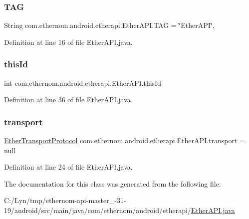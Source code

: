 \subsubsection{\texorpdfstring{T\+AG}{TAG}}
{\footnotesize\ttfamily String com.\+ethernom.\+android.\+etherapi.\+Ether\+A\+P\+I.\+T\+AG = \char`\"{}Ether\+A\+PI\char`\"{}\hspace{0.3cm}{\ttfamily [static]}, {\ttfamily [package]}}



Definition at line 16 of file Ether\+A\+P\+I.\+java.

\mbox{\label{classcom_1_1ethernom_1_1android_1_1etherapi_1_1_ether_a_p_i_a4eb73235f8638afdb798f4351a885951}} 
\subsubsection{\texorpdfstring{this\+Id}{thisId}}
{\footnotesize\ttfamily int com.\+ethernom.\+android.\+etherapi.\+Ether\+A\+P\+I.\+this\+Id}



Definition at line 36 of file Ether\+A\+P\+I.\+java.

\mbox{\label{classcom_1_1ethernom_1_1android_1_1etherapi_1_1_ether_a_p_i_a5af3360721f7c9fadd6221855fa3f4f8}} 
\subsubsection{\texorpdfstring{transport}{transport}}
{\footnotesize\ttfamily \mbox{\hyperlink{classcom_1_1ethernom_1_1android_1_1etherapi_1_1_ether_transport_protocol}{Ether\+Transport\+Protocol}} com.\+ethernom.\+android.\+etherapi.\+Ether\+A\+P\+I.\+transport = null\hspace{0.3cm}{\ttfamily [package]}}



Definition at line 24 of file Ether\+A\+P\+I.\+java.



The documentation for this class was generated from the following file\+:\begin{DoxyCompactItemize}
\item 
C\+:/\+Lyn/tmp/ethernom-\/api-\/master\+\_-\/31-\/19/android/src/main/java/com/ethernom/android/etherapi/\mbox{\hyperlink{_ether_a_p_i_8java}{Ether\+A\+P\+I.\+java}}\end{DoxyCompactItemize}
